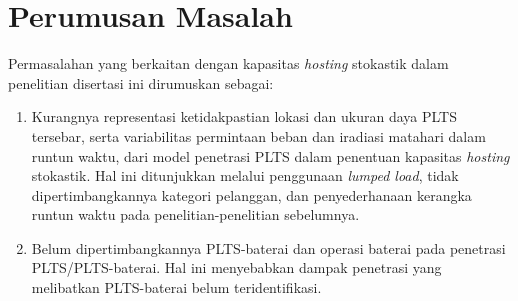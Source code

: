 

\section{Perumusan Masalah}
Permasalahan yang berkaitan dengan kapasitas \textit{hosting} stokastik dalam penelitian disertasi ini dirumuskan sebagai:
\begin{enumerate}
    \item Kurangnya representasi ketidakpastian lokasi dan ukuran daya PLTS tersebar, serta variabilitas permintaan beban dan iradiasi matahari dalam runtun waktu, dari model penetrasi PLTS dalam penentuan kapasitas \textit{hosting} stokastik. Hal ini ditunjukkan melalui penggunaan \textit{lumped load}, tidak dipertimbangkannya kategori pelanggan, dan penyederhanaan kerangka runtun waktu pada penelitian-penelitian sebelumnya.
    \item Belum dipertimbangkannya PLTS-baterai dan operasi baterai pada penetrasi PLTS/PLTS-baterai. Hal ini menyebabkan dampak penetrasi yang melibatkan PLTS-baterai belum teridentifikasi.
\end{enumerate}

